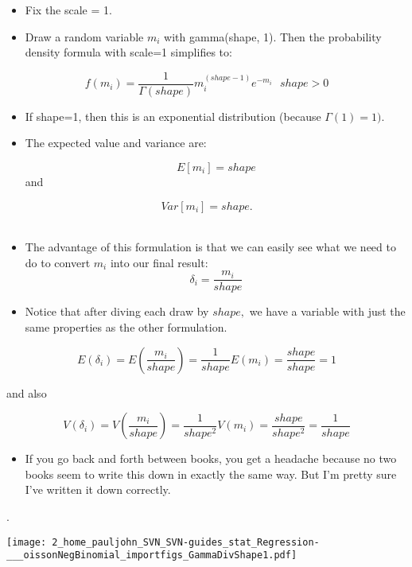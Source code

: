 \documentclass[10pt,english]{beamer}
\def\lyxframeend{} %
\begin{document}
\lyxframeend{}
\begin{itemize}
\item Fix the scale = 1. 
\item Draw a random variable $m_{i}$ with gamma(shape, 1). Then the probability
density formula with scale=1 simplifies to:
\end{itemize}
\[
f(m_{i})=\frac{1}{\Gamma(shape)}m_{i}^{(shape-1)}e^{-m{}_{i}}\,\,\,\, shape>0
\]

\begin{itemize}
\item If shape=1, then this is an exponential distribution (because $\Gamma(1)=1).$ 
\item The expected value and variance are:


\[
E[m_{i}]=shape
\]
and

\end{itemize}
\[
Var[m_{i}]=shape.
\]
\\



\lyxframeend{}
\begin{itemize}
\item The advantage of this formulation is that we can easily see what we
need to do to convert $m_{i}$ into our final result:
\[
\delta_{i}=\frac{m_{i}}{shape}
\]

\item Notice that after diving each draw by $shape,$ we have a variable
with just the same properties as the other formulation.
\end{itemize}
\[
E(\delta_{i})=E(\frac{m_{i}}{shape})=\frac{1}{shape}E(m_{i})=\frac{shape}{shape}=1
\]


and also

\[
V(\delta_{i})=V(\frac{m_{i}}{shape})=\frac{1}{shape^{2}}V(m_{i})=\frac{shape}{shape^{2}}=\frac{1}{shape}
\]

\begin{itemize}
\item If you go back and forth between books, you get a headache because
no two books seem to write this down in exactly the same way. But
I'm pretty sure I've written it down correctly.
\end{itemize}

\lyxframeend{}

.

\begin{center}
\texttt{[image: 2\_home\_pauljohn\_SVN\_SVN-guides\_stat\_Regression-\_\_\_oissonNegBinomial\_importfigs\_GammaDivShape1.pdf]}
\par\end{center}
\end{document}
